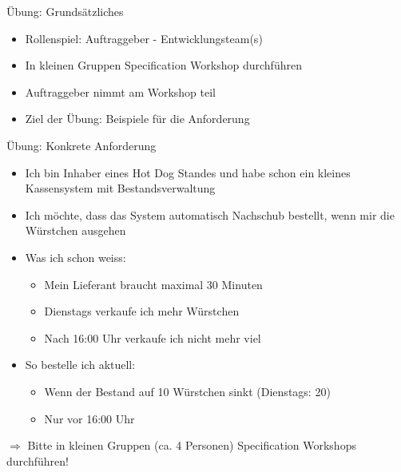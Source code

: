 \begin{frame}{Übung: Grundsätzliches}

\begin{itemize}
	\item Rollenspiel: Auftraggeber - Entwicklungsteam(s)
	
	\item In kleinen Gruppen Specification Workshop durchführen
	
	\item Auftraggeber nimmt am Workshop teil
	
	\item Ziel der Übung: Beispiele für die Anforderung
\end{itemize}
		

\end{frame}




\begin{frame}{Übung: Konkrete Anforderung}

\begin{itemize}
	\item Ich bin Inhaber eines Hot Dog Standes und habe schon ein kleines Kassensystem mit Bestandsverwaltung
	\item Ich möchte, dass das System automatisch Nachschub bestellt, wenn mir die Würstchen ausgehen
	
	\item Was ich schon weiss:
	\begin{itemize}
		\item Mein Lieferant braucht maximal 30 Minuten
		\item Dienstags verkaufe ich mehr Würstchen
		\item Nach 16:00 Uhr verkaufe ich nicht mehr viel
	\end{itemize}
	
	\item So bestelle ich aktuell:
	\begin{itemize}
		\item Wenn der Bestand auf 10 Würstchen sinkt (Dienstags: 20)
		\item Nur vor 16:00 Uhr
	\end{itemize}
\end{itemize}
	
$\Rightarrow$ Bitte in kleinen Gruppen (ca. 4 Personen) Specification Workshops durchführen!

\end{frame}


